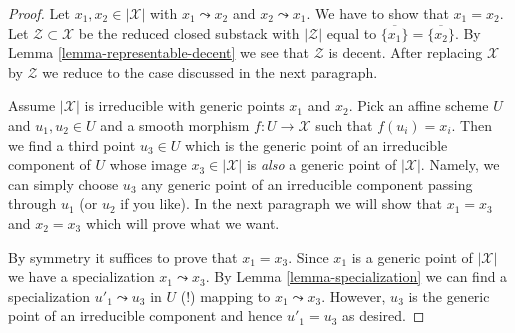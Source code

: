 \documentclass[10pt,a4paper]{amsart}
\theoremstyle{plain}
\theoremstyle{definition}
\theoremstyle{remark}
\numberwithin{equation}{subsection}
\begin{document}
\begin{proof}
Let $x_1, x_2 \in |\mathcal{X}|$ with $x_1 \leadsto x_2$ and
$x_2 \leadsto x_1$. We have to show that $x_1 = x_2$.
Let $\mathcal{Z} \subset \mathcal{X}$ be the reduced closed
substack with $|\mathcal{Z}|$ equal to
$\overline{\{x_1\}} = \overline{\{x_2\}}$.
By Lemma \ref{lemma-representable-decent}
we see that $\mathcal{Z}$ is decent.
After replacing $\mathcal{X}$ by $\mathcal{Z}$ we reduce to
the case discussed in the next paragraph.

\medskip\noindent
Assume $|\mathcal{X}|$ is irreducible with generic points
$x_1$ and $x_2$. Pick an affine scheme $U$ and $u_1, u_2 \in U$
and a smooth morphism $f : U \to \mathcal{X}$ such that
$f(u_i) = x_i$. Then we find a third point $u_3 \in U$
which is the generic point of an irreducible component of $U$
whose image $x_3 \in |\mathcal{X}|$ is {\it also} a
generic point of $|\mathcal{X}|$. Namely, we can simply
choose $u_3$ any generic point of an irreducible component
passing through $u_1$ (or $u_2$ if you like).
In the next paragraph we will show that $x_1 = x_3$ and $x_2 = x_3$
which will prove what we want.

\medskip\noindent
By symmetry it suffices to prove that $x_1 = x_3$. Since $x_1$
is a generic point of $|\mathcal{X}|$ we have a specialization
$x_1 \leadsto x_3$.
By Lemma \ref{lemma-specialization} we can find a specialization
$u'_1 \leadsto u_3$ in $U$ (!) mapping to $x_1 \leadsto x_3$.
However, $u_3$ is the generic point of an irreducible component
and hence $u'_1 = u_3$ as desired.
\end{proof}
\end{document}
